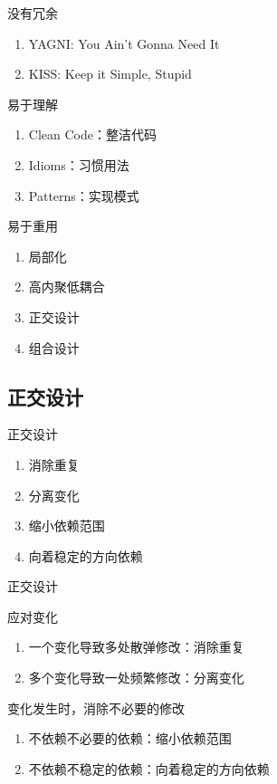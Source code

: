 \begin{frame}{没有冗余}
  \begin{enumerate}
    \item \alert{YAGNI}: You Ain't Gonna Need It
    \item \alert{KISS}: Keep it Simple, Stupid
  \end{enumerate}
\end{frame}

\begin{frame}{易于理解}
  \begin{enumerate}
    \item \alert{Clean Code}：整洁代码
    \item \alert{Idioms}：习惯用法
    \item \alert{Patterns}：实现模式
  \end{enumerate}
\end{frame}

\begin{frame}{易于重用}
    \begin{enumerate}
    \item \alert{局部化}
    \item \alert{高内聚低耦合}
    \item \alert{正交设计}
    \item \alert{组合设计}
    \end{enumerate}
\end{frame}

\subsection{正交设计}

\begin{frame}{正交设计}
    \begin{enumerate}
    \item \alert{消除重复}
    \item \alert{分离变化}
    \item \alert{缩小依赖范围}
    \item \alert{向着稳定的方向依赖}
    \end{enumerate}
\end{frame}

\begin{frame}{正交设计}
  \begin{block}{应对变化} 
    \begin{enumerate}
    \item \alert{一个变化导致多处散弹修改}：消除重复
    \item \alert{多个变化导致一处频繁修改}：分离变化
    \end{enumerate}
  \end{block}

  \begin{block}{变化发生时，消除不必要的修改} 
    \begin{enumerate}
    \item \alert{不依赖不必要的依赖}：缩小依赖范围
    \item \alert{不依赖不稳定的依赖}：向着稳定的方向依赖
    \end{enumerate}
  \end{block}
\end{frame}

